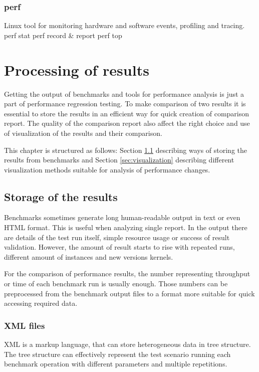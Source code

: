 
\subsection{perf}
Linux tool for monitoring hardware and software events, profiling and tracing.
perf stat
perf record \& report
perf top



\chapter{Processing of results} \label{ch:processing}
Getting the output of benchmarks and tools for performance analysis is just a
part of performance regression testing. To make comparison of two results it is
essential to store the results in an efficient way for quick creation of
comparison report. The quality of the comparison report also affect the right
choice and use of visualization of the results and their comparison.

This chapter is structured as follows: Section \ref{sec:storage} describing
ways of storing the results from benchmarks and Section \ref{sec:visualization}
describing different visualization methods suitable for analysis of performance
changes.

\section{Storage of the results} \label{sec:storage}
Benchmarks sometimes generate long human-readable output in text or even HTML
format. This is useful when analyzing single report. In the output there are details
of the test run itself, simple resource usage or success of result validation.
However, the amount of result starts to rise with repeated runs, different
amount of instances and new versions kernels.

For the comparison of performance results, the number representing throughput or
time of each benchmark run is usually enough. Those numbers can be preprocessed
from the benchmark output files to a format more suitable for quick accessing
required data.

\subsection{XML files}
XML is a markup language, that can store heterogeneous data in tree structure.
The tree structure can effectively represent the test scenario running each
benchmark operation with different parameters and multiple repetitions.

